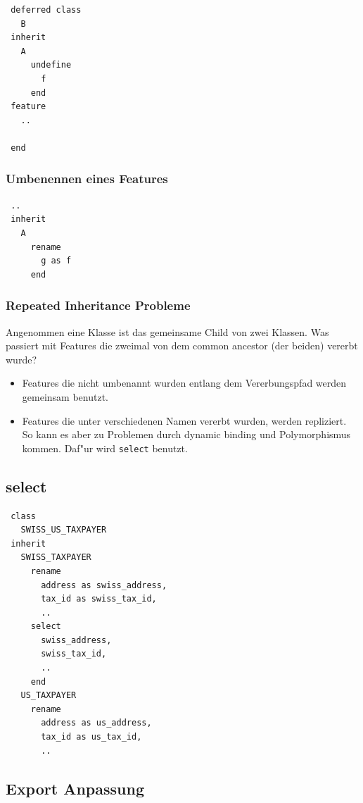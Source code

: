 \documentclass[german, 10pt, a4paper, twocolumn]{scrartcl}
\theoremstyle{definition}
\begin{document}
\begin{verbatim}
 deferred class
   B
 inherit
   A
     undefine
       f
     end
 feature
   ..

 end
\end{verbatim}

\subsubsection{Umbenennen eines Features}

\begin{verbatim}
 ..
 inherit
   A
     rename
       g as f
     end
\end{verbatim}

\subsubsection{Repeated Inheritance Probleme}

Angenommen eine Klasse ist das gemeinsame Child von zwei Klassen. Was passiert mit Features die zweimal von dem common ancestor (der beiden) vererbt wurde?

\begin{itemize}
	\item Features die nicht umbenannt wurden entlang dem Vererbungspfad werden gemeinsam benutzt.
	\item Features die unter verschiedenen Namen vererbt wurden, werden repliziert.\\
		So kann es aber zu Problemen durch dynamic binding und Polymorphismus kommen. Daf"ur wird \verb#select# benutzt.
\end{itemize}

\subsection{select}

\small
\begin{verbatim}
 class
   SWISS_US_TAXPAYER
 inherit
   SWISS_TAXPAYER
     rename
       address as swiss_address,
       tax_id as swiss_tax_id,
       ..
     select
       swiss_address,
       swiss_tax_id,
       ..
     end
   US_TAXPAYER
     rename
       address as us_address,
       tax_id as us_tax_id,
       ..
\end{verbatim}
\normalsize


\subsection{Export Anpassung}
\end{document}
